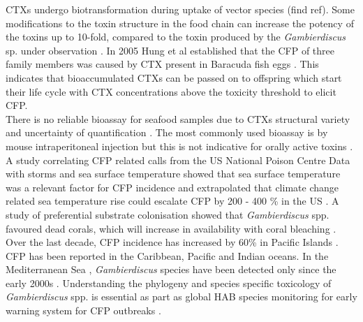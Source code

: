 \documentclass[12pt]{article}
\begin{document}
CTXs undergo biotransformation during uptake of vector species  (find ref). %
Some modifications to the toxin structure in the food chain can increase the potency of the toxins up to 10-fold, compared to the toxin produced by the \emph{Gambierdiscus} sp. under observation \cite{lewis2006ciguatera}.
In 2005 Hung et al established that the CFP of three family members was caused by CTX present in Baracuda fish eggs \cite{hung2005persistent}. This indicates that bioaccumulated CTXs can be passed on to offspring which start their life cycle with CTX concentrations above the toxicity threshold to elicit CFP.  \\ 
There is no reliable bioassay for seafood samples due to CTXs structural variety and uncertainty of quantification \cite{dickey2010ciguatera}. The most commonly used bioassay is by mouse intraperitoneal injection but this is not indicative for orally active toxins \cite{botana2014seafood}.\\
A study correlating CFP related calls from the US National Poison Centre Data with storms and sea surface temperature showed that sea surface temperature was a relevant factor for CFP incidence and extrapolated that climate change related sea temperature rise could escalate CFP by 200 - 400 \% in the US \cite{garces2012habitat}. %
A study of preferential substrate colonisation showed that \emph{Gambierdiscus} spp. favoured dead corals, which will increase in availability with coral bleaching \cite{grzebyk1994ecology}. Over the last decade, CFP incidence has increased by 60\% in Pacific Islands \cite{skinner2011ciguatera}.
CFP has been reported in the Caribbean, Pacific and Indian oceans. In the Mediterranean Sea \cite{lejeusne2010climate}, \emph{Gambierdiscus} species have been detected only since the early 2000s \cite{aligizaki2008morphological}.
Understanding the phylogeny and species specific toxicology of \emph{Gambierdiscus} spp. is essential as part as global HAB species monitoring for early warning system for CFP outbreaks \cite{berdalet2012global}.

\end{document}
